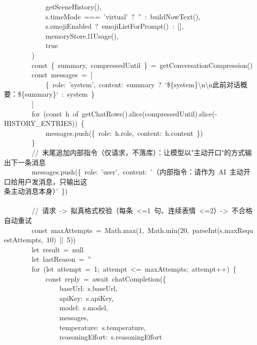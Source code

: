 \documentclass[a4paper,10pt]{article}
\begin{document}
{\ttfamily\footnotesize\raggedright
~~~~~~~~~~~~getSceneHistory(),\\
~~~~~~~~~~~~s.timeMode~===~'virtual'~?~''~:~buildNowText(),\\
~~~~~~~~~~~~s.emojiEnabled~?~emojiListForPrompt()~:~[],\\
~~~~~~~~~~~~memoryStore.l1Usage(),\\
~~~~~~~~~~~~true\\
~~~~~~~~)\\
~~~~~~~~const~\{~summary,~compressedUntil~\}~=~getConversationCompression()\\
~~~~~~~~const~messages~=~[\\
~~~~~~~~~~~~\{~role:~'system',~content:~summary~?~`\$\{system\}\textbackslash{}n\textbackslash{}n此前对话概要：\$\{summary\}`~:~system~\}\\
~~~~~~~~]\\
~~~~~~~~for~(const~h~of~getChatRows().slice(compressedUntil).slice(-HISTORY\_ENTRIES))~\{\\
~~~~~~~~~~~~messages.push(\{~role:~h.role,~content:~h.content~\})\\
~~~~~~~~\}\\
~~~~~~~~//~末尾追加内部指令（仅请求，不落库）：让模型以"主动开口"的方式输出下一条消息\\
~~~~~~~~messages.push(\{~role:~'user',~content:~'（内部指令：请作为~AI~主动开口给用户发消息，只输出这\\
条主动消息本身）'~\})\\
\mbox{}\\
~~~~~~~~//~请求~->~拟真格式校验（每条~<=1~句、连续表情~<=2）->~不合格自动重试\\
~~~~~~~~const~maxAttempts~=~Math.max(1,~Math.min(20,~parseInt(s.maxRequestAttempts,~10)~||~5))\\
~~~~~~~~let~result~=~null\\
~~~~~~~~let~lastReason~=~''\\
~~~~~~~~for~(let~attempt~=~1;~attempt~<=~maxAttempts;~attempt++)~\{\\
~~~~~~~~~~~~const~reply~=~await~chatCompletion(\{\\
~~~~~~~~~~~~~~~~baseUrl:~s.baseUrl,\\
~~~~~~~~~~~~~~~~apiKey:~s.apiKey,\\
~~~~~~~~~~~~~~~~model:~s.model,\\
~~~~~~~~~~~~~~~~messages,\\
~~~~~~~~~~~~~~~~temperature:~s.temperature,\\
~~~~~~~~~~~~~~~~reasoningEffort:~s.reasoningEffort\\
}
\end{document}
